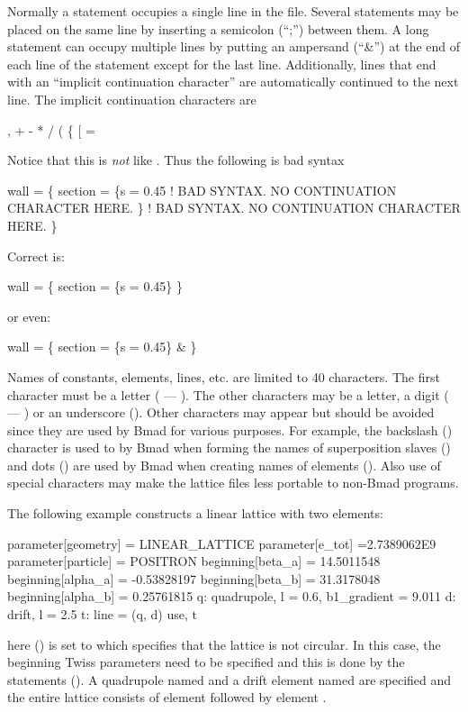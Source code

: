 Normally a statement occupies a single line in the file. Several
statements may be placed on the same line by inserting a semicolon
(``;'') between them. A long statement can occupy multiple lines by
putting an ampersand (``\&'') at the end of each line of the statement
except for the last line. Additionally, lines that end with an
``implicit continuation character''
are automatically continued to the next line. The implicit continuation 
characters are
\begin{example}
  ,   +   -   *   /   (   \{   [   =
\end{example}
Notice
that this is {\em not} like . Thus the following is bad syntax
\begin{example}
  wall = \{
    section = \{s = 0.45     ! BAD SYNTAX. NO CONTINUATION CHARACTER HERE.
    \}                       ! BAD SYNTAX. NO CONTINUATION CHARACTER HERE.
  \}
\end{example}
Correct is:
\begin{example}
  wall = \{
    section = \{s = 0.45\} \}
\end{example}
or even:
\begin{example}
  wall = \{
    section = \{s = 0.45\} \&
  \}
\end{example}

Names of constants, elements, lines, etc. are limited to 40
characters. The first character must be a letter ( --- ).
The other characters may be a letter, a digit ( --- ) or
an underscore (\vn{_}). Other characters may appear but should be avoided
since they are used by Bmad for various purposes. For example, the 
backslash (\vn{\B}) character is used to by Bmad when forming the names of
superposition slaves () and dots () are used by Bmad 
when creating names of  elements (). Also use of
special characters may make the lattice files less portable to non-Bmad programs.

The following example constructs a linear lattice with two elements: 
\begin{example}
  parameter[geometry] = LINEAR_LATTICE
  parameter[e_tot] =2.7389062E9
  parameter[particle] = POSITRON
  beginning[beta_a] = 14.5011548
  beginning[alpha_a] = -0.53828197
  beginning[beta_b] = 31.3178048
  beginning[alpha_b] = 0.25761815
  q: quadrupole, l = 0.6, b1_gradient = 9.011
  d: drift, l = 2.5
  t: line = (q, d)
  use, t 
\end{example}
here  () is set to 
which specifies that the lattice is not circular. In this case, the beginning 
Twiss parameters need to be specified and this is done by the 
statements (). A quadrupole named 
and a drift element named  are specified
and the entire lattice consists of element  followed by element .

